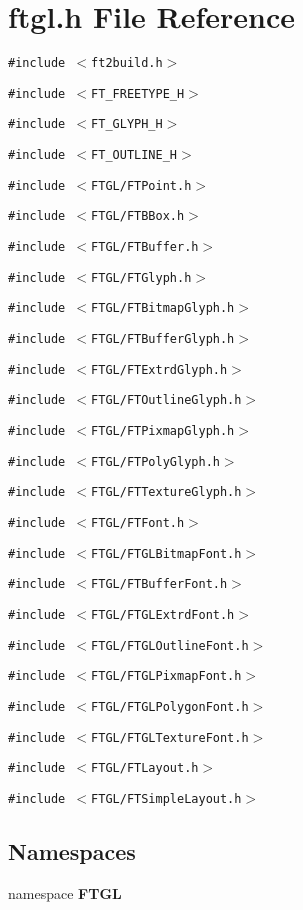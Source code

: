 \section{ftgl.h File Reference}
\label{ftgl_8h}
{\tt \#include $<$ft2build.h$>$}\par
{\tt \#include $<$FT\_\-FREETYPE\_\-H$>$}\par
{\tt \#include $<$FT\_\-GLYPH\_\-H$>$}\par
{\tt \#include $<$FT\_\-OUTLINE\_\-H$>$}\par
{\tt \#include $<$FTGL/FTPoint.h$>$}\par
{\tt \#include $<$FTGL/FTBBox.h$>$}\par
{\tt \#include $<$FTGL/FTBuffer.h$>$}\par
{\tt \#include $<$FTGL/FTGlyph.h$>$}\par
{\tt \#include $<$FTGL/FTBitmapGlyph.h$>$}\par
{\tt \#include $<$FTGL/FTBufferGlyph.h$>$}\par
{\tt \#include $<$FTGL/FTExtrdGlyph.h$>$}\par
{\tt \#include $<$FTGL/FTOutlineGlyph.h$>$}\par
{\tt \#include $<$FTGL/FTPixmapGlyph.h$>$}\par
{\tt \#include $<$FTGL/FTPolyGlyph.h$>$}\par
{\tt \#include $<$FTGL/FTTextureGlyph.h$>$}\par
{\tt \#include $<$FTGL/FTFont.h$>$}\par
{\tt \#include $<$FTGL/FTGLBitmapFont.h$>$}\par
{\tt \#include $<$FTGL/FTBufferFont.h$>$}\par
{\tt \#include $<$FTGL/FTGLExtrdFont.h$>$}\par
{\tt \#include $<$FTGL/FTGLOutlineFont.h$>$}\par
{\tt \#include $<$FTGL/FTGLPixmapFont.h$>$}\par
{\tt \#include $<$FTGL/FTGLPolygonFont.h$>$}\par
{\tt \#include $<$FTGL/FTGLTextureFont.h$>$}\par
{\tt \#include $<$FTGL/FTLayout.h$>$}\par
{\tt \#include $<$FTGL/FTSimpleLayout.h$>$}\par
\subsection*{Namespaces}
\begin{CompactItemize}
\item 
namespace {\bf FTGL}
\end{CompactItemize}
